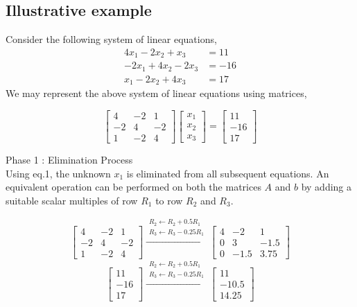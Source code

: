 \subsection{Illustrative example}
	Consider the following system of linear equations,
	\begin{align*}
		4x_1  - 2x_2  + x_3 & = 11 \\
		-2x_1  + 4x_2 - 2x_3 & = -16 \\
		x_1  - 2x_2 + 4x_3 & = 17 
	\end{align*} 
	We may represent the above system of linear equations using matrices,

	\[ \begin{bmatrix} 4 & -2 & 1 \\ -2 & 4 & -2 \\ 1 & -2 & 4 \end{bmatrix} \begin{bmatrix} x_1 \\ x_2 \\ x_3 \end{bmatrix} = \begin{bmatrix} 11 \\ -16 \\ 17 \end{bmatrix} \]

	Phase 1 : Elimination Process\\

	Using eq.1, the unknown $x_1$ is eliminated from all subsequent equations. An equivalent operation can be performed on both the matrices $A$ and $b$ by adding a suitable scalar multiples of row $R_1$ to row $R_2$ and $R_3$. 

	\[ \begin{bmatrix} 4 & -2 & 1 \\ -2 & 4 & -2 \\ 1 & -2 & 4 \end{bmatrix} \xrightarrow{\substack{R_2 \leftarrow R_2 + 0.5R_1\\ R_3 \leftarrow R_3 - 0.25R_1}} \begin{bmatrix} 4 & -2 & 1 \\ 0 & 3 & -1.5 \\ 0 & -1.5 & 3.75 \end{bmatrix}\]
	\[ \begin{bmatrix} 11 \\ -16 \\ 17 \end{bmatrix} \xrightarrow{\substack{R_2 \leftarrow R_2 + 0.5R_1 \\ R_3 \leftarrow R_3 - 0.25R_1}} \begin{bmatrix} 11 \\ -10.5 \\ 14.25 \end{bmatrix} \]

